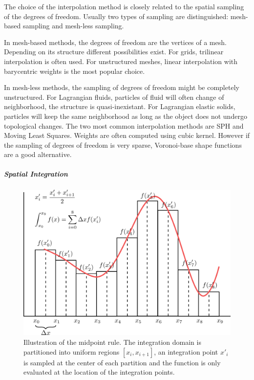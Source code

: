 The choice of the interpolation method is closely related to the spatial sampling of the degrees of freedom. Usually two types of sampling are distinguished: mesh-based sampling and mesh-less sampling.

In mesh-based methods, the degrees of freedom are the vertices of a mesh. Depending on its structure different possibilities exist. For grids, trilinear interpolation is often used. For unstructured meshes, linear interpolation with barycentric weights is the most popular choice.

In mesh-less methods, the sampling of degrees of freedom might be completely unstructured. For Lagrangian fluids, particles of fluid will often change of neighborhood, the structure is quasi-inexistant. For Lagrangian elastic solids, particles will keep the same neighborhood as long as the object does not undergo topological changes. The two most common interpolation methods are SPH and Moving Least Squares. Weights are often computed using cubic kernel. However if the sampling of degrees of freedom is very sparse, Voronoi-base shape functions are a good alternative.

\subparagraph{Spatial Integration}

\begin{figure}[!ht]
\centering
\includegraphics[scale=1.0]{images/continuum_mechanics/spatialIntegration.png}
\caption[STAR mechanics: Spatial integration]{\label{fig:spatialIntegration} Illustration of the midpoint rule. The integration domain is partitioned into uniform regions $\left[x_{i}, x_{i+1}\right]$, an integration point $x'_{i}$ is sampled at the center of each partition and the function is only evaluated at the location of the integration points.}
\end{figure}

